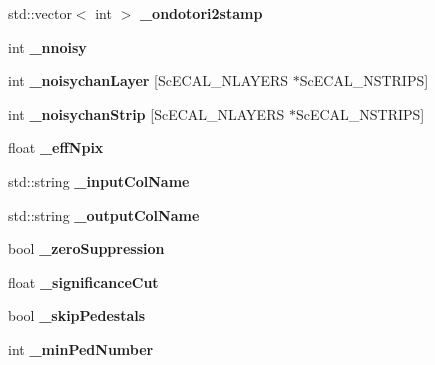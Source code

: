 \begin{DoxyCompactItemize}
\item 
std\-::vector$<$ int $>$ {\bfseries \-\_\-ondotori2stamp}\label{classCALICE_1_1IntegratedScECALCalibrationProcessor_a8a2a540275a5de1c440ea6389f549868}

\item 
int {\bfseries \-\_\-nnoisy}\label{classCALICE_1_1IntegratedScECALCalibrationProcessor_a9ce2884633802f471e62c13483ced0a2}

\item 
int {\bfseries \-\_\-noisychan\-Layer} [Sc\-E\-C\-A\-L\-\_\-\-N\-L\-A\-Y\-E\-R\-S $\ast$Sc\-E\-C\-A\-L\-\_\-\-N\-S\-T\-R\-I\-P\-S]\label{classCALICE_1_1IntegratedScECALCalibrationProcessor_aadbc356c230573212c8c1e9f9f3f41cc}

\item 
int {\bfseries \-\_\-noisychan\-Strip} [Sc\-E\-C\-A\-L\-\_\-\-N\-L\-A\-Y\-E\-R\-S $\ast$Sc\-E\-C\-A\-L\-\_\-\-N\-S\-T\-R\-I\-P\-S]\label{classCALICE_1_1IntegratedScECALCalibrationProcessor_ad5fb35024421a55936030f4f7469fbd7}

\item 
float {\bfseries \-\_\-eff\-Npix}\label{classCALICE_1_1IntegratedScECALCalibrationProcessor_afede1e6bc146049a6553c9801fe839dd}

\item 
std\-::string {\bfseries \-\_\-input\-Col\-Name}\label{classCALICE_1_1IntegratedScECALCalibrationProcessor_ac42a0277e9b4dc421591e8d3df6e76c4}

\item 
std\-::string {\bfseries \-\_\-output\-Col\-Name}\label{classCALICE_1_1IntegratedScECALCalibrationProcessor_afc10b206d4c70c3254ee8db9c7983e8f}

\item 
bool {\bfseries \-\_\-zero\-Suppression}\label{classCALICE_1_1IntegratedScECALCalibrationProcessor_a3bc7d6f1828510d0a9588f23f8c201eb}

\item 
float {\bfseries \-\_\-significance\-Cut}\label{classCALICE_1_1IntegratedScECALCalibrationProcessor_a30185444af319ee6da502b64817e82f6}

\item 
bool {\bfseries \-\_\-skip\-Pedestals}\label{classCALICE_1_1IntegratedScECALCalibrationProcessor_a78af7130e141695755c6e3448ca73283}

\item 
int {\bfseries \-\_\-min\-Ped\-Number}\label{classCALICE_1_1IntegratedScECALCalibrationProcessor_a1a2f99e38ea563324ffbeff1f342848b}


\end{DoxyCompactItemize}
